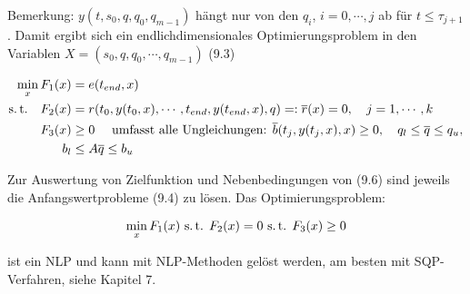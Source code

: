 Bemerkung: $y(t,s_0,q,q_0,q_{m-1})$ hängt nur von den $q_i$, $i=0,\cdots,j$ ab für $t \leq \tau_{j+1}$. Damit ergibt sich ein endlichdimensionales Optimierungsproblem in den Variablen $X=(s_0,q,q_0,\cdots,q_{m-1})$ (9.3)

\begin{align*}
\min_x F_1(x) &= e({t_{end}}, x) \\
\text{s.\,t.} \quad F_2(x) &= r(t_0, y(t_0, x), \cdots, {t_{end}}, y({t_{end}}, x), q) =: \overline r(x) = 0, \quad j=1,\cdots,k\\
F_3(x) & \geq 0 \quad \text{ umfasst alle Ungleichungen: } \overline b(t_j,y(t_j,x),x) \geq 0, \quad q_l \leq \overline q \leq q_u, \\
b_l & \leq A \overline q \leq b_u \\
\end{align*}

Zur Auswertung von Zielfunktion und Nebenbedingungen von (9.6) sind jeweils die Anfangswertprobleme (9.4) zu lösen. Das Optimierungsproblem:

\begin{align*}
\min_x F_1(x) \text{ s.\,t. } F_2(x) = 0 \text{ s.\,t. } F_3(x) \geq 0 
\end{align*}

ist ein NLP und kann mit NLP-Methoden gelöst werden, am besten mit SQP-Verfahren, siehe Kapitel 7.





